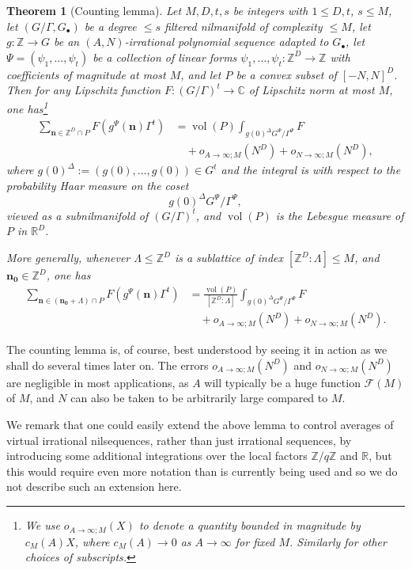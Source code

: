 \documentclass[11pt,reqno]{amsart}
\numberwithin{equation}{section}
\theoremstyle{plain}
\newtheorem{theorem}[subsection]{Theorem}
\theoremstyle{definition}
\renewcommand{\leq}{\leqslant}
\newcommand\Z{\mathbb{Z}}
\newcommand\R{\mathbb{R}}
\newcommand\C{\mathbb{C}}
\newcommand\1{{\bf 1}}
\newcommand\2{{\bf 2}}
\newcommand\Grow{{\mathcal F}}
\begin{document}
\begin{theorem}[Counting lemma]\label{count-lem}  Let $M,D,t,s$ be integers with $1 \leq D, t$, $s \leq M$, let $(G/\Gamma,G_\bullet)$ be a degree $\leq s$ filtered nilmanifold of complexity $\leq M$, let $g: \Z \to G$ be an $(A,N)$-irrational polynomial sequence adapted to $G_\bullet$, let $\Psi = (\psi_1,\ldots,\psi_t)$ be a collection of linear forms $\psi_1,\ldots,\psi_t: \Z^D \to \Z$ with coefficients of magnitude at most $M$, and let $P$ be a convex subset of $[-N,N]^{D}$.  Then for any Lipschitz function $F: (G/\Gamma)^t \to \C$ of Lipschitz norm at most $M$, one has\footnote{We use $o_{A \to \infty;M}(X)$ to denote a quantity bounded in magnitude by $c_M(A) X$, where $c_M(A) \to 0$ as $A \to \infty$ for fixed $M$.  Similarly for other choices of subscripts.} 
\begin{align*}
 \sum_{\mathbf{n} \in \Z^D \cap P} F(g^\Psi(\mathbf{n})\Gamma^t) 
 &= \operatorname{vol}(P) \int_{g(0)^\Delta G^{\Psi}/\Gamma^{\Psi}} F \\
 &\quad + o_{A \to \infty;M}( N^D ) + o_{N \to \infty; M}(N^D),
\end{align*}
where $g(0)^\Delta := (g(0),\ldots,g(0)) \in G^t$ and the integral is with respect to the probability Haar measure on the coset \[ g(0)^\Delta G^{\Psi}/\Gamma^{\Psi},\] viewed as a subnilmanifold of $(G/\Gamma)^t$, and $\operatorname{vol}(P)$ is the Lebesgue measure of $P$ in $\R^D$.

More generally, whenever $\Lambda \leq \Z^D$ is a sublattice of index $[\Z^D:\Lambda] \leq M$, and $\mathbf{n_0} \in \Z^D$, one has
\begin{align*}
\sum_{\mathbf{n} \in (\mathbf{n_0}+\Lambda) \cap P} F(g^\Psi(\mathbf{n})\Gamma^t) &= \frac{\operatorname{vol}(P) }{[\Z^D:\Lambda]} \int_{g(0)^\Delta G^{\Psi}/\Gamma^{\Psi}} F\\
&\quad  + o_{A \to \infty;M}( N^D ) + o_{N \to \infty; M}(N^D).
\end{align*}
\end{theorem}

The counting lemma is, of course, best understood by seeing it in action as we shall do several times later on.  The errors $o_{A \to \infty;M}(N^D)$ and $o_{N \to \infty;M}(N^D)$ are negligible in most applications, as $A$ will typically be a huge function $\Grow(M)$ of $M$, and $N$ can also be taken to be arbitrarily large compared to $M$.

We remark that one could easily extend the above lemma to control averages of virtual irrational nilsequences, rather than just irrational sequences, by introducing some additional integrations over the local factors $\Z/q\Z$ and $\R$, but this would require even more notation than is currently being used and so we do not describe such an extension here.\vspace{11pt}
\end{document}
